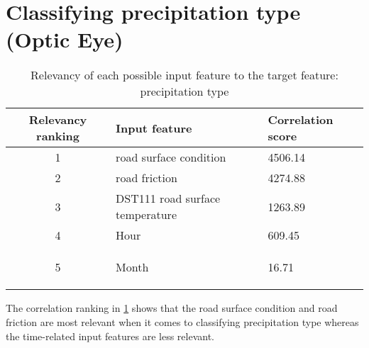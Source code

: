 \section{Classifying precipitation type (Optic Eye)}

	\begin{table}[H]
		\centering
		\caption{Relevancy of each possible input feature to the target feature: precipitation type }
		\begin{tabular}[3]{c | l | l }
    			Relevancy ranking & Input feature & Correlation score  \\
			 \hline
			1 & road surface condition & 4506.14 \\ \hline
			2 & road friction & 4274.88 \\ \hline
			3 & DST111 road surface temperature & 1263.89 \\ \hline
			4 & Hour & 609.45 \\ \hline
			5 & Month & 16.71 
 
			\label{table:feature_comparison_prectype}
		\end{tabular}
	\end{table}

	The correlation ranking in \ref{table:feature_comparison_prectype} shows that the road surface condition and road friction are most relevant when it comes to classifying precipitation type whereas the time-related input features are less relevant.

